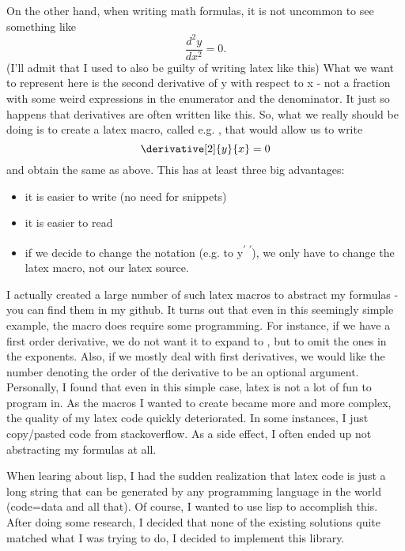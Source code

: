 \documentclass[11pt]{article}
\begin{document}
On the other hand, when writing math formulas, it is not uncommon to see something like
\begin{equation}
\frac{d^2 y}{dx^2} = 0.
\end{equation}
(I'll admit that I used to also be guilty of writing latex like this)
What we want to represent here is the second derivative of y with respect to x - 
not a fraction with some weird expressions in the enumerator and the denominator.
It just so happens that derivatives are often written like this.
So, what we really should be doing is to create a latex macro, called e.g.
\derivative, that would allow us to write
\begin{equation}
\derivative[2]{y}{x} = 0
\end{equation}
and obtain the same as above. This has at least three big advantages:
\begin{itemize}
\item it is easier to write (no need for snippets)
\item it is easier to read
\item if we decide to change the notation (e.g. to y\textsuperscript{\(\prime\) \(\prime\)}), we only have to change the latex macro, not our latex source.
\end{itemize}
I actually created a large number of such latex macros to abstract my formulas - you can find them 
in my github. 
It turns out that even in this seemingly simple example, the 
macro does require some programming. For instance, if we have a first order derivative,
we do not want it to expand to
, but to omit the ones in the exponents. Also, if we mostly deal with first 
derivatives, we would like the number denoting the order of the derivative to 
be an optional argument. 
Personally, I found that even in this simple case, latex is not a lot of fun 
to program in. As the macros I wanted to create became more and more complex, 
the quality of my latex code quickly deteriorated. In some instances, I just copy/pasted 
code from stackoverflow. As a side effect, I often ended up not abstracting my formulas at
all.

When learing about lisp, I had the sudden realization that latex code is just 
a long string that can be generated by any programming language in the world (code=data and 
all that). Of course, I wanted to use lisp to accomplish this.
After doing some research, I decided that none of the existing solutions 
quite matched what I was trying to do, I decided to implement this library.
\end{document}
